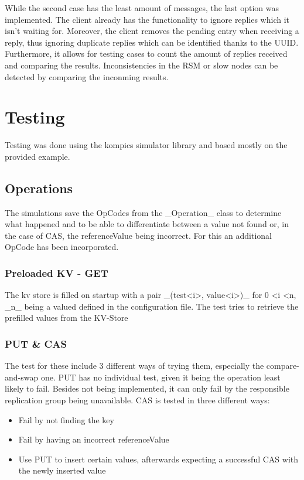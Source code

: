 \documentclass[a4paper]{scrartcl}
\begin{document}
While the second case has the least amount of messages, the last option was implemented. 
The client already has the functionality to ignore replies which it isn't waiting for.
Moreover, the client removes  the pending entry when receiving a reply, thus ignoring duplicate replies which can be identified thanks to the UUID.
Furthermore, it allows for testing cases to count the amount of replies received and comparing the results.
Inconsistencies in the RSM or slow nodes can be detected by comparing the inconming results.


\section{Testing}
Testing was done using the kompics simulator library and based mostly on the provided example.

\subsection{Operations}
The simulations save the OpCodes from the _Operation_ class to determine what happened and to be able to differentiate between a value not found or, in the case of CAS, the referenceValue being incorrect. For this an additional OpCode has been incorporated.

\subsubsection{Preloaded KV - GET}
The kv store is filled on  startup with a pair _(test<i>, value<i>)_ for 0 \textless i \textless n, _n_ being a valued defined in the configuration file.
The test tries to retrieve the prefilled values from the KV-Store

\subsubsection{PUT \& CAS}
The test for these include 3 different ways of trying them, especially the compare-and-swap one.
PUT has no individual test, given it being the operation least likely to fail.  Besides not being implemented, it can only fail by the responsible replication group being unavailable.
CAS is tested in three different ways:
\begin{itemize}
\item Fail by not finding the key 
\item Fail by having an incorrect referenceValue
\item Use PUT to insert certain values, afterwards expecting a successful CAS with the newly inserted value
\end{itemize}
\end{document}

